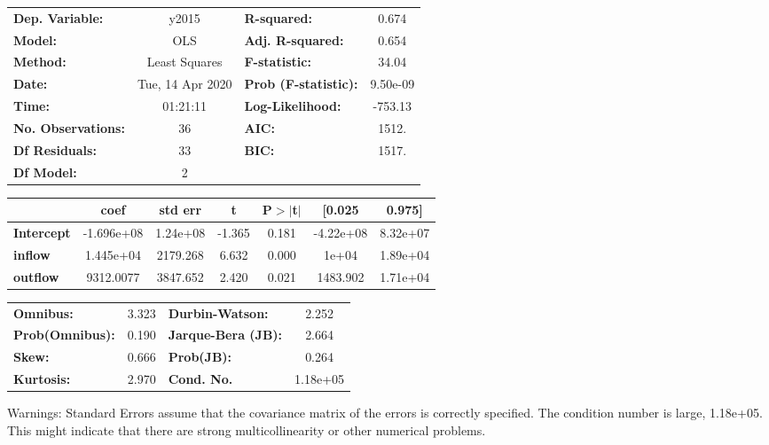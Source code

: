 \begin{center}
\begin{tabular}{lclc}
\toprule
\textbf{Dep. Variable:}    &      y2015       & \textbf{  R-squared:         } &     0.674   \\
\textbf{Model:}            &       OLS        & \textbf{  Adj. R-squared:    } &     0.654   \\
\textbf{Method:}           &  Least Squares   & \textbf{  F-statistic:       } &     34.04   \\
\textbf{Date:}             & Tue, 14 Apr 2020 & \textbf{  Prob (F-statistic):} &  9.50e-09   \\
\textbf{Time:}             &     01:21:11     & \textbf{  Log-Likelihood:    } &   -753.13   \\
\textbf{No. Observations:} &          36      & \textbf{  AIC:               } &     1512.   \\
\textbf{Df Residuals:}     &          33      & \textbf{  BIC:               } &     1517.   \\
\textbf{Df Model:}         &           2      & \textbf{                     } &             \\
\bottomrule
\end{tabular}
\begin{tabular}{lcccccc}
                   & \textbf{coef} & \textbf{std err} & \textbf{t} & \textbf{P$> |$t$|$} & \textbf{[0.025} & \textbf{0.975]}  \\
\midrule
\textbf{Intercept} &   -1.696e+08  &     1.24e+08     &    -1.365  &         0.181        &    -4.22e+08    &     8.32e+07     \\
\textbf{inflow}    &    1.445e+04  &     2179.268     &     6.632  &         0.000        &        1e+04    &     1.89e+04     \\
\textbf{outflow}   &    9312.0077  &     3847.652     &     2.420  &         0.021        &     1483.902    &     1.71e+04     \\
\bottomrule
\end{tabular}
\begin{tabular}{lclc}
\textbf{Omnibus:}       &  3.323 & \textbf{  Durbin-Watson:     } &    2.252  \\
\textbf{Prob(Omnibus):} &  0.190 & \textbf{  Jarque-Bera (JB):  } &    2.664  \\
\textbf{Skew:}          &  0.666 & \textbf{  Prob(JB):          } &    0.264  \\
\textbf{Kurtosis:}      &  2.970 & \textbf{  Cond. No.          } & 1.18e+05  \\
\bottomrule
\end{tabular}
\end{center}

Warnings: \newline
 [1] Standard Errors assume that the covariance matrix of the errors is correctly specified. \newline
 [2] The condition number is large, 1.18e+05. This might indicate that there are \newline
 strong multicollinearity or other numerical problems.